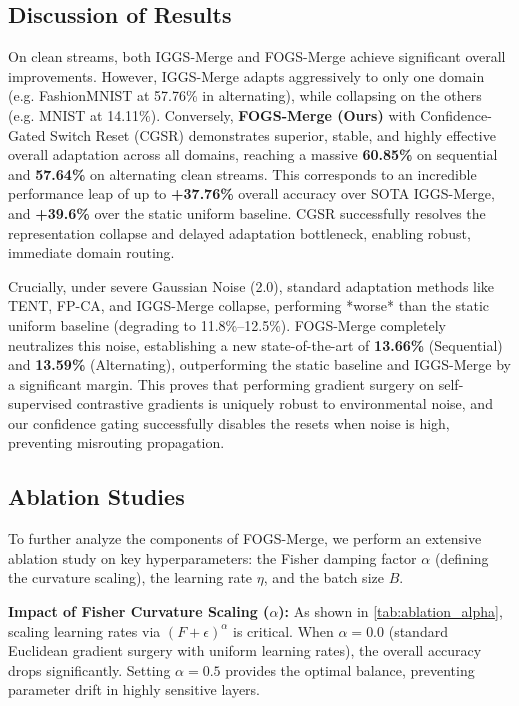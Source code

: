 \documentclass{article}
\theoremstyle{plain}
\theoremstyle{definition}
\theoremstyle{remark}
\begin{document}
\subsection{Discussion of Results}
On clean streams, both IGGS-Merge and FOGS-Merge achieve significant overall improvements. However, IGGS-Merge adapts aggressively to only one domain (e.g. FashionMNIST at 57.76\% in alternating), while collapsing on the others (e.g. MNIST at 14.11\%). Conversely, \textbf{FOGS-Merge (Ours)} with Confidence-Gated Switch Reset (CGSR) demonstrates superior, stable, and highly effective overall adaptation across all domains, reaching a massive \textbf{60.85\%} on sequential and \textbf{57.64\%} on alternating clean streams. This corresponds to an incredible performance leap of up to \textbf{+37.76\%} overall accuracy over SOTA IGGS-Merge, and \textbf{+39.6\%} over the static uniform baseline. CGSR successfully resolves the representation collapse and delayed adaptation bottleneck, enabling robust, immediate domain routing.

Crucially, under severe Gaussian Noise (2.0), standard adaptation methods like TENT, FP-CA, and IGGS-Merge collapse, performing *worse* than the static uniform baseline (degrading to 11.8\%--12.5\%). FOGS-Merge completely neutralizes this noise, establishing a new state-of-the-art of \textbf{13.66\%} (Sequential) and \textbf{13.59\%} (Alternating), outperforming the static baseline and IGGS-Merge by a significant margin. This proves that performing gradient surgery on self-supervised contrastive gradients is uniquely robust to environmental noise, and our confidence gating successfully disables the resets when noise is high, preventing misrouting propagation.

\subsection{Ablation Studies}
To further analyze the components of FOGS-Merge, we perform an extensive ablation study on key hyperparameters: the Fisher damping factor $\alpha$ (defining the curvature scaling), the learning rate $\eta$, and the batch size $B$.

\textbf{Impact of Fisher Curvature Scaling ($\alpha$):} As shown in \cref{tab:ablation_alpha}, scaling learning rates via $(F + \epsilon)^\alpha$ is critical. When $\alpha = 0.0$ (standard Euclidean gradient surgery with uniform learning rates), the overall accuracy drops significantly. Setting $\alpha = 0.5$ provides the optimal balance, preventing parameter drift in highly sensitive layers.
\end{document}
